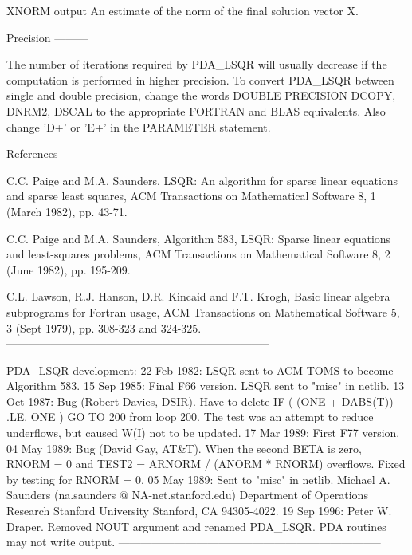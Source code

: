 \documentclass[11pt,twoside,nolof]{starlink}
\begin{document}
\begin{terminalv}
     XNORM   output     An estimate of the norm of the final
                        solution vector X.


     Precision
     ---------

     The number of iterations required by PDA_LSQR will usually decrease
     if the computation is performed in higher precision.  To convert
     PDA_LSQR between single and double precision, change the words
                        DOUBLE PRECISION
                        DCOPY, DNRM2, DSCAL
     to the appropriate FORTRAN and BLAS equivalents.
     Also change 'D+' or 'E+' in the PARAMETER statement.


     References
     ----------

     C.C. Paige and M.A. Saunders,  LSQR: An algorithm for sparse
          linear equations and sparse least squares,
          ACM Transactions on Mathematical Software 8, 1 (March 1982),
          pp. 43-71.

     C.C. Paige and M.A. Saunders,  Algorithm 583, LSQR: Sparse
          linear equations and least-squares problems,
          ACM Transactions on Mathematical Software 8, 2 (June 1982),
          pp. 195-209.

     C.L. Lawson, R.J. Hanson, D.R. Kincaid and F.T. Krogh,
          Basic linear algebra subprograms for Fortran usage,
          ACM Transactions on Mathematical Software 5, 3 (Sept 1979),
          pp. 308-323 and 324-325.
-----------------------------------------------------------------------


     PDA_LSQR development:
     22 Feb 1982: LSQR sent to ACM TOMS to become Algorithm 583.
     15 Sep 1985: Final F66 version.  LSQR sent to "misc" in netlib.
     13 Oct 1987: Bug (Robert Davies, DSIR).  Have to delete
                     IF ( (ONE + DABS(T)) .LE. ONE ) GO TO 200
                  from loop 200.  The test was an attempt to reduce
                  underflows, but caused W(I) not to be updated.
     17 Mar 1989: First F77 version.
     04 May 1989: Bug (David Gay, AT&T).  When the second BETA is zero,
                  RNORM = 0 and
                  TEST2 = ARNORM / (ANORM * RNORM) overflows.
                  Fixed by testing for RNORM = 0.
     05 May 1989: Sent to "misc" in netlib.
     Michael A. Saunders            (na.saunders @ NA-net.stanford.edu)
     Department of Operations Research
     Stanford University
     Stanford, CA 94305-4022.
     19 Sep 1996: Peter W. Draper. Removed NOUT argument and renamed
                  PDA_LSQR. PDA routines may not write output.
-----------------------------------------------------------------------
\end{terminalv}
\end{document}
